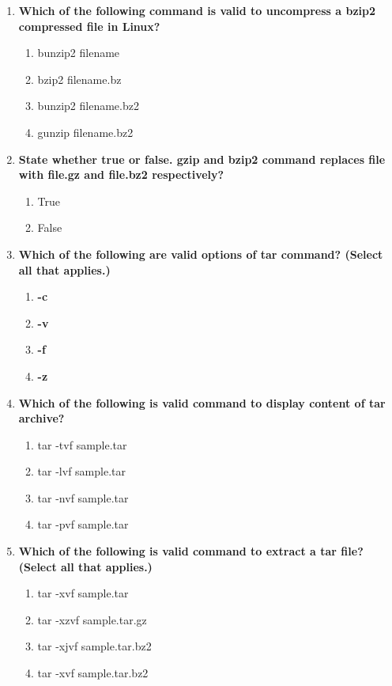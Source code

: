 \begin{flushleft}
\begin{enumerate}
		
		\item \textbf{Which of the following command is valid to uncompress a bzip2 compressed file in Linux?}
		\begin{enumerate}[label=(\alph*)]
			\item bunzip2 filename       
			\item bzip2 filename.bz
			\item bunzip2 filename.bz2   %
			\item gunzip filename.bz2
		\end{enumerate}
		\bigskip
		\bigskip
		
		\item \textbf{State whether true or false. gzip and bzip2 command replaces \textbf{file} with \textbf{file.gz} and \textbf{file.bz2} respectively?}
		\begin{enumerate}[label=(\alph*)]
			\item True  %
			\item False
		\end{enumerate}
	
		\bigskip
		\bigskip	
		\item \textbf{Which of the following are valid options of tar command? (Select all that applies.)}
		\begin{enumerate}[label=(\alph*)]
			\item \textbf{-c}  %
			\item \textbf{-v}  %
			\item \textbf{-f}  %
			\item \textbf{-z}  %
		\end{enumerate}
		\bigskip
		\bigskip

		\item \textbf{Which of the following is valid command to display content of tar archive?}
		\begin{enumerate}[label=(\alph*)]
			\item tar -tvf sample.tar  %
			\item tar -lvf sample.tar
			\item tar -nvf sample.tar
			\item tar -pvf sample.tar
		\end{enumerate}
		\bigskip
		\bigskip
		
		
		\item \textbf{Which of the following is valid command to extract a tar file? (Select all that applies.)}
		\begin{enumerate}[label=(\alph*)]
			\item tar -xvf  sample.tar    %
			\item tar -xzvf sample.tar.gz  %
			\item tar -xjvf sample.tar.bz2   %
			\item tar -xvf  sample.tar.bz2
		\end{enumerate}
		\bigskip
		\bigskip
		
	\end{enumerate}
	
	
\end{flushleft}

\newpage

\afterpage{\blankpage}